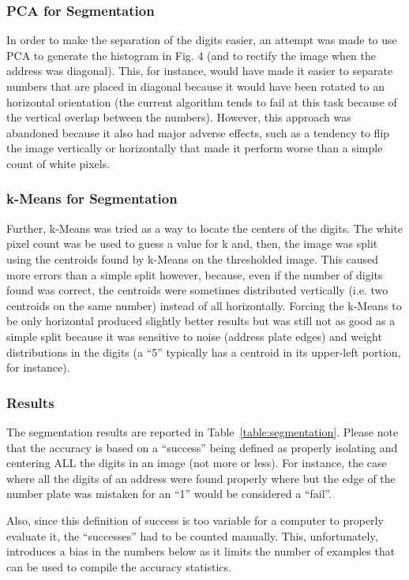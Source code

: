 \documentclass{article} %
\begin{document}
\subsubsection{PCA for Segmentation}
In order to make the separation of the digits easier, an attempt was made to use PCA to generate the histogram in Fig. 4 (and to rectify the image when the address was diagonal). This, for instance, would have made it easier to separate numbers that are placed in diagonal because it would have been rotated to an horizontal orientation (the current algorithm tends to fail at this task because of the vertical overlap between the numbers). However, this approach was abandoned because it also had major adverse effects, such as a tendency to flip the image vertically or horizontally that made it perform worse than a simple count of white pixels.

\subsubsection{k-Means for Segmentation}
Further, k-Means was tried as a way to locate the centers of the digits. The white pixel count was be used to guess a value for k and, then, the image was split using the centroids found by k-Means on the thresholded image. This caused more errors than a simple split however, because, even if the number of digits found was correct, the centroids were sometimes distributed vertically (i.e. two centroids on the same number) instead of all horizontally. Forcing the k-Means to be only horizontal produced slightly better results but was still not as good as a simple split because it was sensitive to noise (address plate edges) and weight distributions in the digits (a “5” typically has a centroid in its upper-left portion, for instance).

\subsubsection{Results}
The segmentation results are reported in Table~\ref{table:segmentation}. Please note that the accuracy is based on a “success” being defined as properly isolating and centering ALL the digits in an image (not more or less). For instance, the case where all the digits of an address were found properly where but the edge of the number plate was mistaken for an “1” would be considered a “fail”. 

Also, since this definition of success is too variable for a computer to properly evaluate it, the “successes” had to be counted manually. This, unfortunately, introduces a bias in the numbers below as it limits the number of examples that can be used to compile the accuracy statistics.
\end{document}
